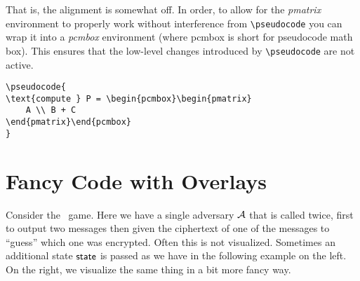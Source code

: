 \documentclass[a4paper]{report}
\begin{document}
That is, the alignment is somewhat off. In order, to allow for the \emph{pmatrix} environment to properly work without interference from \lstinline{\pseudocode}
you can wrap it into a \emph{pcmbox} environment (where pcmbox is short for pseudocode math box). This ensures that the low-level changes introduced by  \lstinline{\pseudocode} are not active.

\begin{lstlisting}
\pseudocode{
\text{compute } P = \begin{pcmbox}\begin{pmatrix}
    A \\ B + C
\end{pmatrix}\end{pcmbox}
}
\end{lstlisting}

\begin{center}
\end{center}


\section{Fancy Code with Overlays}

Consider the \indcpa\ game. Here we have a single adversary $\mathcal{A}$ that is called twice, first to output two messages then
given the ciphertext of one of the messages to \enquote{guess} which one was encrypted. Often this is not visualized.
Sometimes an additional state $\mathsf{state}$ is passed as we have in the following example on the left. On the right,
we visualize the same thing in a bit more fancy way.
\end{document}

